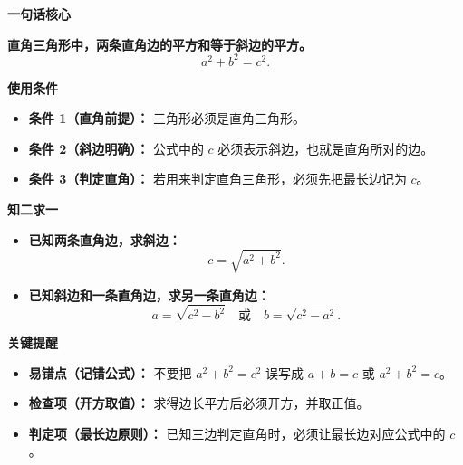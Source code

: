 \begin{summarybox}
	\textbf{\textcolor{CSummary}{一句话核心}}

	\textbf{直角三角形中，两条直角边的平方和等于斜边的平方。}
	\[
		a^2+b^2=c^2.
	\]

	\medskip
	\textbf{\textcolor{CSummary}{使用条件}}
	\begin{itemize}[leftmargin=*, itemsep=0.5em, topsep=0.4em]
		\item \textbf{条件 1（直角前提）：} 三角形必须是直角三角形。
		\item \textbf{条件 2（斜边明确）：} 公式中的 $c$ 必须表示斜边，也就是直角所对的边。
		\item \textbf{条件 3（判定直角）：} 若用来判定直角三角形，必须先把最长边记为 $c$。
	\end{itemize}

	\medskip
	\textbf{\textcolor{CSummary}{知二求一}}
	\begin{itemize}[leftmargin=*, itemsep=0.5em, topsep=0.4em]
		\item \textbf{已知两条直角边，求斜边：}
		      \[
			      c=\sqrt{a^2+b^2}.
		      \]
		\item \textbf{已知斜边和一条直角边，求另一条直角边：}
		      \[
			      a=\sqrt{c^2-b^2}
			      \quad\text{或}\quad
			      b=\sqrt{c^2-a^2}.
		      \]
	\end{itemize}

	\medskip
	\textbf{\textcolor{CSummary}{关键提醒}}
	\begin{itemize}[leftmargin=*, itemsep=0.5em, topsep=0.4em]
		\item \textbf{易错点（记错公式）：} 不要把 $a^2+b^2=c^2$ 误写成 $a+b=c$ 或 $a^2+b^2=c$。
		\item \textbf{检查项（开方取值）：} 求得边长平方后必须开方，并取正值。
		\item \textbf{判定项（最长边原则）：} 已知三边判定直角时，必须让最长边对应公式中的 $c$。
	\end{itemize}
\end{summarybox}